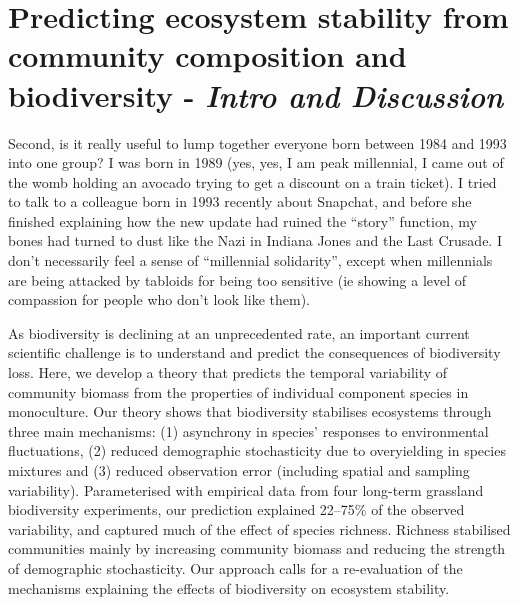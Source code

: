 \section*{Predicting ecosystem stability from community composition and biodiversity \citep{DeMazancourt2013} - \textit{Intro and Discussion}}
Second, is it really useful to lump together everyone born between 1984 and 1993 into one group? I was born in 1989 (yes, yes, I am peak millennial, I came out of the womb holding an avocado trying to get a discount on a train ticket). I tried to talk to a colleague born in 1993 recently about Snapchat, and before she finished explaining how the new update had ruined the “story” function, my bones had turned to dust like the Nazi in Indiana Jones and the Last Crusade. I don’t necessarily feel a sense of “millennial solidarity”, except when millennials are being attacked by tabloids for being too sensitive (ie showing a level of compassion for people who don’t look like them).


As biodiversity is declining at an unprecedented rate, an important current scientific challenge is to understand and predict the consequences of biodiversity loss. Here, we develop a theory that predicts the temporal variability of community biomass from the properties of individual component species in monoculture. Our theory shows that biodiversity stabilises ecosystems through three main mechanisms: (1) asynchrony in species’ responses to environmental fluctuations, (2) reduced demographic stochasticity due to overyielding in species mixtures and (3) reduced observation error (including spatial and sampling variability). Parameterised with empirical data from four long-term grassland biodiversity experiments, our prediction explained 22–75\% of the observed variability, and captured much of the effect of species richness. Richness stabilised communities mainly by increasing community biomass and reducing the strength of demographic stochasticity. Our approach calls for a re-evaluation of the mechanisms explaining the effects of biodiversity on ecosystem stability.

